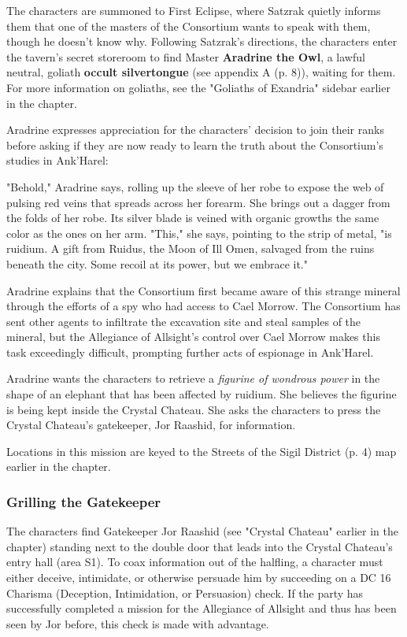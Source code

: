 \documentclass[a4paper, 11pt, bg=full, twocolumn, nooutline]{dndbook}
\begin{document}
The characters are summoned to First Eclipse, where Satzrak quietly informs them that one of the masters of the Consortium wants to speak with them, though he doesn't know why. Following Satzrak's directions, the characters enter the tavern's secret storeroom to find Master \textbf{Aradrine the Owl}, a lawful neutral, goliath \textbf{occult silvertongue} (see appendix A (p. 8)), waiting for them. For more information on goliaths, see the "Goliaths of Exandria" sidebar earlier in the chapter.

Aradrine expresses appreciation for the characters' decision to join their ranks before asking if they are now ready to learn the truth about the Consortium's studies in Ank'Harel:

\begin{DndReadAloud}
"Behold," Aradrine says, rolling up the sleeve of her robe to expose the web of pulsing red veins that spreads across her forearm. She brings out a dagger from the folds of her robe. Its silver blade is veined with organic growths the same color as the ones on her arm. "This," she says, pointing to the strip of metal, "is ruidium. A gift from Ruidus, the Moon of Ill Omen, salvaged from the ruins beneath the city. Some recoil at its power, but we embrace it."
\end{DndReadAloud}

Aradrine explains that the Consortium first became aware of this strange mineral through the efforts of a spy who had access to Cael Morrow. The Consortium has sent other agents to infiltrate the excavation site and steal samples of the mineral, but the Allegiance of Allsight's control over Cael Morrow makes this task exceedingly difficult, prompting further acts of espionage in Ank'Harel.

Aradrine wants the characters to retrieve a \textit{figurine of wondrous power} in the shape of an elephant that has been affected by ruidium. She believes the figurine is being kept inside the Crystal Chateau. She asks the characters to press the Crystal Chateau's gatekeeper, Jor Raashid, for information.

Locations in this mission are keyed to the Streets of the Sigil District (p. 4) map earlier in the chapter.

\subsubsection{Grilling the Gatekeeper}

The characters find Gatekeeper Jor Raashid (see "Crystal Chateau" earlier in the chapter) standing next to the double door that leads into the Crystal Chateau's entry hall (area S1). To coax information out of the halfling, a character must either deceive, intimidate, or otherwise persuade him by succeeding on a DC 16 Charisma (Deception, Intimidation, or Persuasion) check. If the party has successfully completed a mission for the Allegiance of Allsight and thus has been seen by Jor before, this check is made with advantage.
\end{document}
